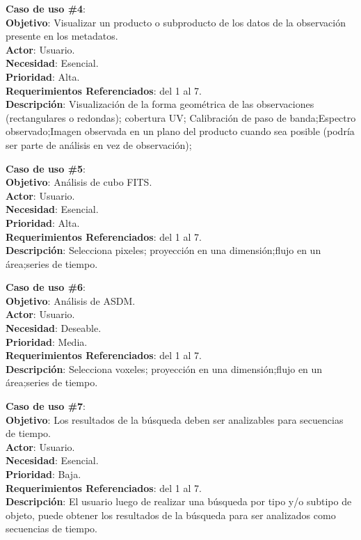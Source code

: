 \noindent\textbf{Caso de uso \#4}: \\
\noindent\textbf{Objetivo}: Visualizar un producto o subproducto de los datos de la observación presente en los metadatos. \\
\textbf{Actor}: Usuario. \\
\textbf{Necesidad}: Esencial. \\
\textbf{Prioridad}: Alta. \\
\textbf{Requerimientos Referenciados}: del 1 al 7. \\
\textbf{Descripción}: Visualización de la forma geométrica de las observaciones (rectangulares o redondas); cobertura UV; Calibración de paso de banda;Espectro observado;Imagen observada en un plano del producto cuando sea posible (podría ser parte de análisis en vez de observación);
\vspace{1.0cm}

\noindent\textbf{Caso de uso \#5}: \\
\noindent\textbf{Objetivo}: Análisis de cubo FITS. \\
\textbf{Actor}: Usuario.\\
\textbf{Necesidad}: Esencial. \\
\textbf{Prioridad}: Alta. \\
\textbf{Requerimientos Referenciados}: del 1 al 7. \\
\textbf{Descripción}: Selecciona pixeles; proyección en una dimensión;flujo en un área;series de tiempo.
\vspace{1.0cm}

\noindent\textbf{Caso de uso \#6}: \\
\noindent\textbf{Objetivo}: Análisis de ASDM. \\
\textbf{Actor}: Usuario. \\
\textbf{Necesidad}: Deseable. \\
\textbf{Prioridad}: Media. \\
\textbf{Requerimientos Referenciados}: del 1 al 7. \\
\textbf{Descripción}: Selecciona voxeles; proyección en una dimensión;flujo en un área;series de tiempo.
\vspace{1.0cm}

\noindent\textbf{Caso de uso \#7}: \\
\noindent\textbf{Objetivo}: Los resultados de la búsqueda deben ser analizables para secuencias de tiempo. \\
\textbf{Actor}: Usuario. \\
\textbf{Necesidad}: Esencial. \\
\textbf{Prioridad}: Baja. \\
\textbf{Requerimientos Referenciados}: del 1 al 7. \\
\textbf{Descripción}: El usuario luego de realizar una búsqueda por tipo y/o subtipo de objeto, puede obtener los resultados de la búsqueda para ser analizados como secuencias de tiempo.
\vspace{1.0cm}

